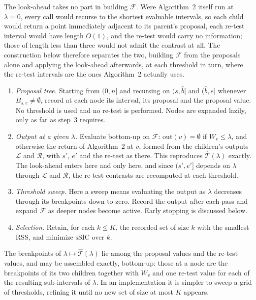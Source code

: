 \documentclass[12pt, a4paper]{article}
\newcommand{\algmain}{Algorithm~2}
\begin{document}
The look-ahead takes no part in building $\mathcal{F}$. Were
\algmain{} itself run at $\lambda = 0$, every call would recurse to the
shortest evaluable intervals, so each child would return a point immediately
adjacent to its parent's proposal, each re-test interval would have length
$O(1)$, and the re-test would carry no information; those of length less than
three would not admit the contrast at all. The construction below therefore separates the two, building
$\mathcal{F}$ from the proposals alone and applying the look-ahead afterwards,
at each threshold in turn, where the re-test intervals are the ones \algmain{}
actually uses.

\begin{enumerate}
\item \emph{Proposal tree.} Starting from $(0,n]$ and recursing on
$(s,\hat b]$ and $(\hat b,e]$ whenever $B_{s,e} \ne \emptyset$, record at each
node its interval, its proposal and the proposal value. No threshold is used
and no re-test is performed. Nodes are expanded lazily, only as far as step~3
requires.

\item \emph{Output at a given $\lambda$.} Evaluate bottom-up on $\mathcal{F}$:
$\mathrm{out}(v) = \emptyset$ if $W_v \le \lambda$, and otherwise the return of
\algmain{} at $v$, formed from the children's outputs $\mathcal{L}$ and
$\mathcal{R}$, with $s'$, $e'$ and the re-test as there. This reproduces
$\hat{\mathcal{T}}(\lambda)$ exactly. The look-ahead enters here and only here,
and since $(s',e']$ depends on $\lambda$ through $\mathcal{L}$ and
$\mathcal{R}$, the re-test contrasts are recomputed at each threshold.

\item \emph{Threshold sweep.} Here a sweep means evaluating the output as
$\lambda$ decreases through its breakpoints down to zero. Record the output
after each pass and expand $\mathcal{F}$ as deeper nodes become active. Early
stopping is discussed below.

\item \emph{Selection.} Retain, for each $k \le K$, the recorded set of size
$k$ with the smallest $\mathrm{RSS}$, and minimize $\mathrm{sSIC}$ over $k$.
\end{enumerate}

The breakpoints of $\lambda \mapsto \hat{\mathcal{T}}(\lambda)$ lie among the
proposal values and the re-test values, and may be assembled exactly, bottom-up:
those at a node are the breakpoints of its two children together with $W_v$ and
one re-test value for each of the resulting sub-intervals of $\lambda$. In an
implementation it is simpler to sweep a grid of thresholds, refining it until no
new set of size at most $K$ appears.
\end{document}
